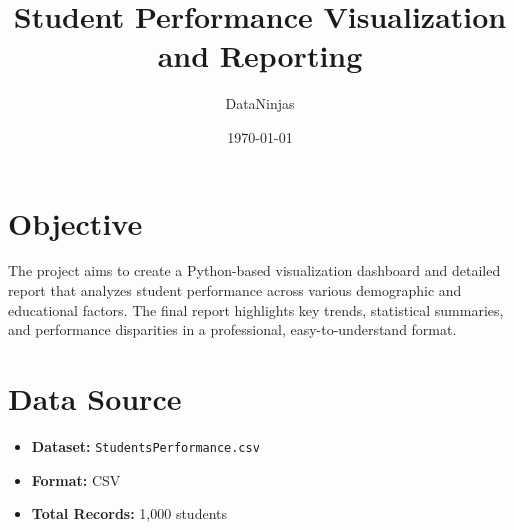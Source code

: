 \documentclass[12pt]{article}
\title{Student Performance Visualization and Reporting}
\author{DataNinjas}
\date{\today}
\begin{document}
\maketitle


\section{Objective}
The project aims to create a Python-based visualization dashboard and detailed report that analyzes student performance across various demographic and educational factors. The final report highlights key trends, statistical summaries, and performance disparities in a professional, easy-to-understand format.

\section{Data Source}
\begin{itemize}[leftmargin=1.5em]
    \item \textbf{Dataset:} \texttt{StudentsPerformance.csv}
    \item \textbf{Format:} CSV
    \item \textbf{Total Records:} 1,000 students
\end{itemize}
\end{document}
